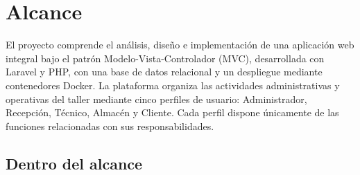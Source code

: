 \section{Alcance}

El proyecto comprende el análisis, diseño e implementación de una aplicación web integral bajo el patrón Modelo-Vista-Controlador (MVC), desarrollada con Laravel y PHP, con una base de datos relacional y un despliegue mediante contenedores Docker. La plataforma organiza las actividades administrativas y operativas del taller mediante cinco perfiles de usuario: Administrador, Recepción, Técnico, Almacén y Cliente. Cada perfil dispone únicamente de las funciones relacionadas con sus responsabilidades.

\subsection{Dentro del alcance}

